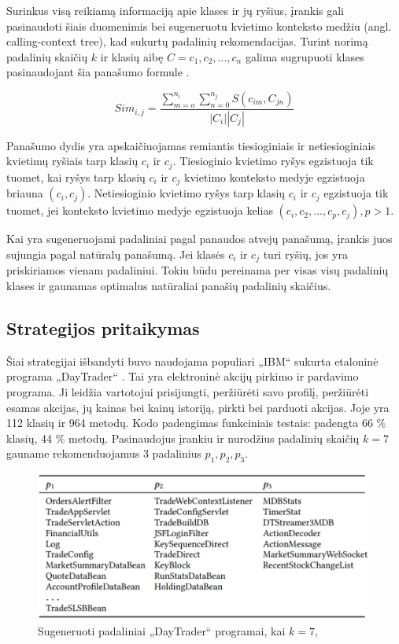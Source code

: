 \documentclass{VUMIFPSbakalaurinis}
\begin{document}
Surinkus visą reikiamą informaciją apie klases ir jų ryšius, įrankis gali pasinaudoti šiais duomenimis bei sugeneruotu kvietimo konteksto medžiu (angl. calling-context tree), kad sukurtų padalinių rekomendacijas. Turint norimą padalinių skaičių $k$ ir klasių aibę $C = {c_{1}, c_{2}, ..., c_{n}}$ galima sugrupuoti klases pasinaudojant šia panašumo formule \cite{KXL+20}.

\begin{equation}\label{eq:panasumo-formule}
    Sim_{i,j} = \frac{\sum_{m=o}^{n_{i}}\sum_{n=0}^{n_{j}}S(c_{im},C_{jn})}{\left| C_{i} \right|\left| C_{j} \right|}
\end{equation}

Panašumo dydis yra apskaičiuojamas remiantis tiesioginiais ir netiesioginiais kvietimų ryšiais tarp klasių $c_{i}$ ir $c_{j}$. Tiesioginio kvietimo ryšys egzistuoja tik tuomet, kai ryšys tarp klasių $c_{i}$ ir $c_{j}$ kvietimo konteksto medyje egzistuoja briauna $(c_{i}, c_{j})$. Netiesioginio kvietimo ryšys tarp klasių $c_{i}$ ir $c_{j}$ egzistuoja tik tuomet, jei konteksto kvietimo medyje egzistuoja kelias $(c_{i}, c_{2}, ..., c_{p}, c_{j}), p > 1$.

Kai yra sugeneruojami padaliniai pagal panaudos atvejų panašumą, įrankis juos sujungia pagal natūralų panašumą. Jei klasės $c_{i}$ ir $c_{j}$ turi ryšių, jos yra priskiriamos vienam padaliniui. Tokiu būdu pereinama per visas visų padalinių klases ir gaunamas optimalus natūraliai panašių padalinių skaičius.

\subsection{Strategijos pritaikymas}
Šiai strategijai išbandyti buvo naudojama populiari „IBM“ sukurta etaloninė programa „DayTrader“ \cite{IBM15}. Tai yra elektroninė akcijų pirkimo ir pardavimo programa. Ji leidžia vartotojui prisijungti, peržiūrėti savo profilį, peržiūrėti esamas akcijas, jų kainas bei kainų istoriją, pirkti bei parduoti akcijas. Joje yra 112 klasių ir 964 metodų. Kodo padengimas funkciniais testais: padengta  66 \% klasių, 44 \% metodų. Pasinaudojus įrankiu ir nurodžius padalinių skaičių $k = 7$ gauname rekomenduojamus 3 padalinius $p_{1}, p_{2}, p_{3}$.

\begin{figure}[H]
    \centering
    \includegraphics{img/mono-micro-padaliniai.png}
    \caption{Sugeneruoti padaliniai „DayTrader“ programai, kai $k = 7$, \cite{KXK+21}}
    \label{img:mono-micro-padaliniai}
\end{figure}
\end{document}
